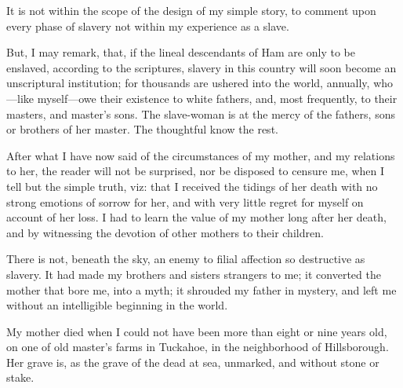 It is not within the scope of the design of my simple story, to comment
upon every phase of slavery not within my experience as a slave.

But, I may remark, that, if the lineal descendants of Ham are only to be
enslaved, according to the {\protect\hypertarget{60}{}{}}scriptures,
slavery in this country will soon become an unscriptural institution;
for thousands are ushered into the world, annually, who---like
myself---owe their existence to white fathers, and, most frequently, to
their masters, and master's sons. The slave-woman is at the mercy of the
fathers, sons or brothers of her master. The thoughtful know the rest.

After what I have now said of the circumstances of my mother, and my
relations to her, the reader will not be surprised, nor be disposed to
censure me, when I tell but the simple truth, viz: that I received the
tidings of her death with no strong emotions of sorrow for her, and with
very little regret for myself on account of her loss. I had to learn the
value of my mother long after her death, and by witnessing the devotion
of other mothers to their children.

There is not, beneath the sky, an enemy to filial affection so
destructive as slavery. It had made my brothers and sisters strangers to
me; it converted the mother that bore me, into a myth; it shrouded my
father in mystery, and left me without an intelligible beginning in the
world.

My mother died when I could not have been more than eight or nine years
old, on one of old master's farms in Tuckahoe, in the neighborhood of
Hillsborough. Her grave is, as the grave of the dead at sea, unmarked,
and without stone or stake.
